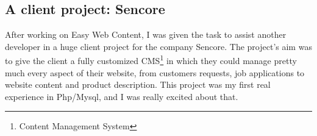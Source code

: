 \subsection{A client project: Sencore}
After working on Easy Web Content, I was given the task to assist another developer in a huge client project for the company Sencore. The project's aim was to give the client a fully customized CMS\footnote{Content Management System} in which they could manage pretty much every aspect of their website, from customers requests, job applications to website content and product description. This project was my first real experience in Php/Mysql, and I was really excited about that.